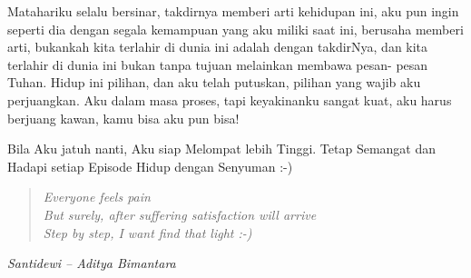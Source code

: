 Matahariku selalu bersinar, takdirnya memberi arti kehidupan ini, aku pun ingin seperti dia dengan segala kemampuan yang aku miliki saat ini, berusaha memberi arti, bukankah kita terlahir di dunia ini adalah dengan takdirNya, dan kita terlahir di dunia ini bukan tanpa tujuan melainkan membawa pesan- pesan Tuhan. Hidup ini pilihan, dan aku telah putuskan, pilihan yang wajib aku perjuangkan. Aku dalam masa proses, tapi keyakinanku sangat kuat, aku harus berjuang kawan, kamu bisa aku pun bisa!

Bila Aku jatuh nanti, Aku siap Melompat lebih Tinggi.
Tetap Semangat dan Hadapi setiap Episode Hidup dengan Senyuman :-)

\begin{quote}
\textit{Everyone feels pain
\\
But surely, after suffering satisfaction will arrive
\\
Step by step, I want find that light :-) 
}\end{quote}

\begin{flushright}
\textit{Santidewi – Aditya Bimantara}
\end{flushright}
\normalsize